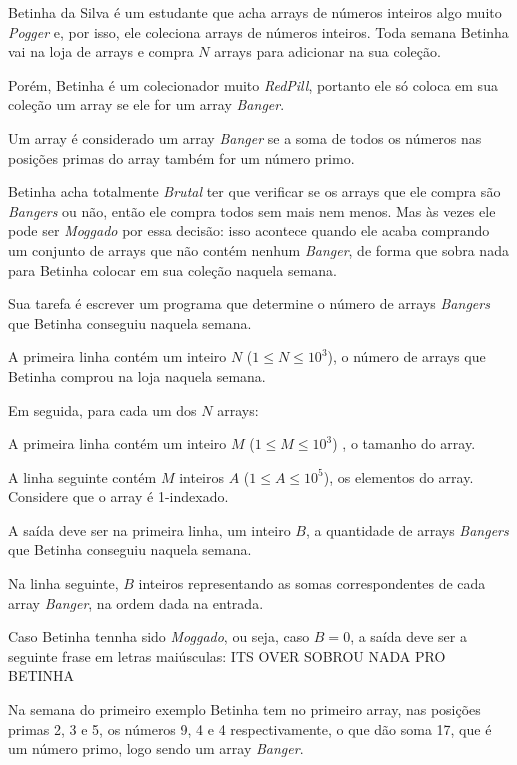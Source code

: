 Betinha da Silva é um estudante que acha arrays de números inteiros algo muito \textit{Pogger} e, por isso, ele coleciona arrays de números inteiros.  
Toda semana Betinha vai na loja de arrays e compra $N$ arrays para adicionar na sua coleção.  

Porém, Betinha é um colecionador muito \textit{RedPill}, portanto ele só coloca em sua coleção um array se ele for um array \textit{Banger}.  

Um array é considerado um array \textit{Banger} se a soma de todos os números nas posições primas do array também for um número primo.  

Betinha acha totalmente \textit{Brutal} ter que verificar se os arrays que ele compra são \textit{Bangers} ou não, então ele compra todos sem mais nem menos.  
Mas às vezes ele pode ser \textit{Moggado} por essa decisão: isso acontece quando ele acaba comprando um conjunto de arrays que não contém nenhum \textit{Banger}, de forma que sobra nada para Betinha colocar em sua coleção naquela semana.  

Sua tarefa é escrever um programa que determine o número de arrays \textit{Bangers} que Betinha conseguiu naquela semana.

A primeira linha contém um inteiro $N$ ($1 \leq N \leq 10^3$), o número de arrays que Betinha comprou na loja naquela semana.  

Em seguida, para cada um dos $N$ arrays:  

A primeira linha contém um inteiro $M$ ($1 \leq M \leq 10^3$) , o tamanho do array.  

A linha seguinte contém $M$ inteiros $A$ ($1 \leq A \leq 10^5$), os elementos do array. Considere que o array é 1-indexado.

A saída deve ser na primeira linha, um inteiro $B$, a quantidade de arrays \textit{Bangers} que Betinha conseguiu naquela semana.  

Na linha seguinte, $B$ inteiros representando as somas correspondentes de cada array \textit{Banger}, na ordem dada na entrada.

Caso Betinha tennha sido \textit{Moggado}, ou seja, caso $B = 0$, a saída deve ser a seguinte frase em letras maiúsculas: ITS OVER SOBROU NADA PRO BETINHA

Na semana do primeiro exemplo Betinha tem no primeiro array, nas posições primas 2, 3 e 5, os números 9, 4 e 4 respectivamente, o que dão soma 17, que é um número primo, logo sendo um array \textit{Banger}.

